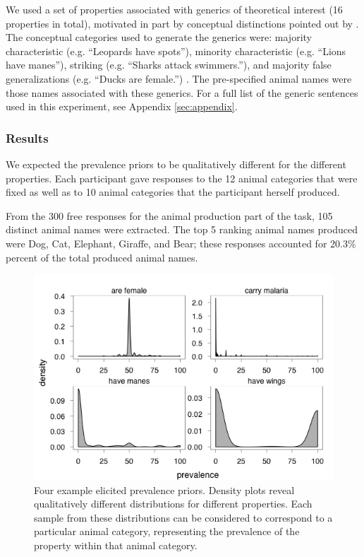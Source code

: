 \documentclass[10pt,letterpaper]{article}
\begin{document}
We used a set of properties associated with generics of theoretical interest (16 properties in total), motivated in part by conceptual distinctions pointed out by . 
The conceptual categories used to generate the generics were: majority characteristic (e.g. ``Leopards have spots''), minority characteristic (e.g. ``Lions have manes''), striking (e.g. ``Sharks attack swimmers.''), and majority false generalizations (e.g. ``Ducks are female.'') \cite{Prasada2013}. 
The pre-specified animal names were those names associated with these generics.  For a full list of the generic sentences used in this experiment, see Appendix \ref{sec:appendix}.

\subsubsection{Results}

We expected the prevalence priors to be qualitatively different for the different properties. Each participant gave responses to the 12 animal categories that were fixed as well as to 10 animal categories that the participant herself produced. 

From the 300 free responses for the animal production part of the task, 105 distinct animal names were extracted. The top 5 ranking animal names produced were Dog, Cat, Elephant, Giraffe, and Bear; these responses accounted for 20.3\% percent of the total produced animal names.

\begin{figure}
\centering
    \includegraphics[width=0.8\columnwidth]{priors-exp1a-4types}
    \caption{Four example elicited prevalence priors. Density plots reveal qualitatively different distributions for different properties. Each sample from these distributions can be considered to correspond to a particular animal category, representing the prevalence of the property within that animal category.}
  \label{fig:priors1a}
\end{figure}
\end{document}
